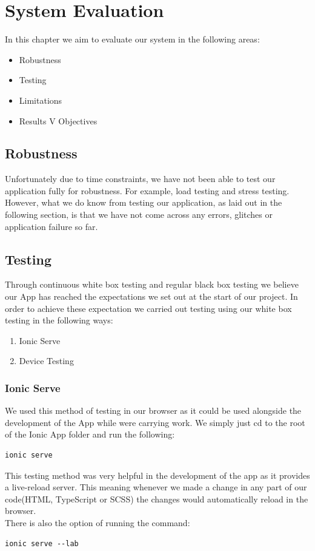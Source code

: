 \documentclass[12pt,a4paper,oneside,openany]{book}
\begin{document}
\chapter{System Evaluation}
In this chapter we aim to evaluate our system in the following areas:
\begin{itemize}
    \item Robustness
    \item Testing
    \item Limitations
    \item Results V Objectives
\end{itemize}

\section{Robustness}
Unfortunately due to time constraints, we have not been able to test our application fully for robustness. For example, load testing and stress testing. 
However, what we do know from testing our application, as laid out in the following section, is that we have not come across any errors, glitches or application failure so far.\cite{robustness}

\section{Testing}
Through continuous white box testing and regular black box testing we believe our App has reached the expectations we set out at the start of our project. In order to achieve these expectation we carried out testing using our white box testing in the following ways:
\begin{enumerate}
    \item Ionic Serve
    \item Device Testing
\end{enumerate}

\subsection{Ionic Serve}
We used this method of testing in our browser as it could be used alongside the development of the App while were carrying work. We simply just cd to the root of the Ionic App folder and run the following:
\begin{verbatim}
ionic serve
\end{verbatim}

This testing method was very helpful in the development of the app as it provides a live-reload server. This meaning whenever we made a change in any part of our code(HTML, TypeScript or SCSS) the changes would automatically reload in the browser.
\\
There is also the option of running the command:
\begin{verbatim}
ionic serve --lab
\end{verbatim}
\end{document}
